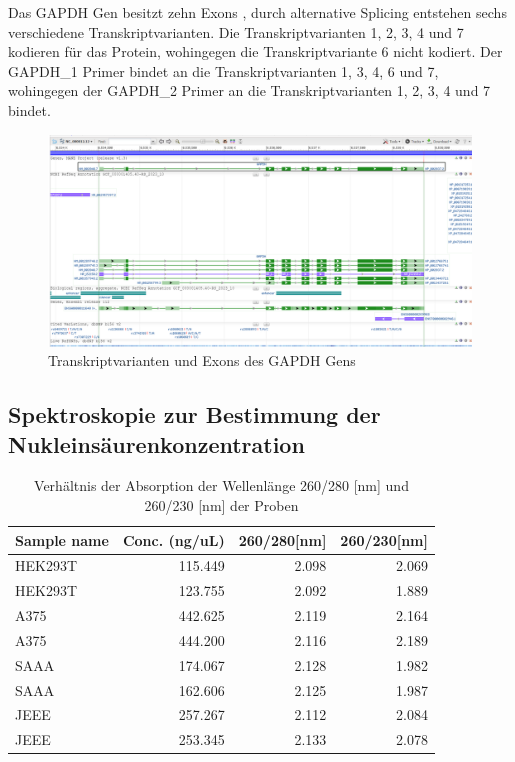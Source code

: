\documentclass{article}
\begin{document}
Das GAPDH Gen besitzt zehn Exons \cite{NCBIGene2597}, durch alternative Splicing entstehen sechs verschiedene Transkriptvarianten. Die Transkriptvarianten 1, 2, 3, 4 und 7 kodieren für das Protein, wohingegen die Transkriptvariante 6 nicht kodiert. Der GAPDH\_1 Primer bindet an die Transkriptvarianten 1, 3, 4, 6 und 7, wohingegen der GAPDH\_2 Primer an die Transkriptvarianten 1, 2, 3, 4 und 7 bindet.
\begin{figure}[H]
    \centering
    \includegraphics[width=\textwidth]{images/gapdh.png}
    \caption{Transkriptvarianten und Exons des GAPDH Gens \cite{NCBIGene2597_products}}
    \label{fig:exons}
\end{figure}

\subsection*{Spektroskopie zur Bestimmung der Nukleinsäurenkonzentration}

\begin{table}[H]
    \centering
    \begin{tabular}{lrrr}
    \toprule
    Sample name & Conc. (ng/uL) & 260/280[nm] & 260/230[nm] \\
    \midrule
    HEK293T & 115.449 & 2.098 & 2.069 \\
    HEK293T & 123.755 & 2.092 & 1.889 \\
    A375 & 442.625 & 2.119 & 2.164 \\
    A375 & 444.200 & 2.116 & 2.189 \\
    SAAA & 174.067 & 2.128 & 1.982 \\
    SAAA & 162.606 & 2.125 & 1.987 \\
    JEEE & 257.267 & 2.112 & 2.084 \\
    JEEE & 253.345 & 2.133 & 2.078 \\
    \bottomrule
    \end{tabular}
    \caption{Verhältnis der Absorption der Wellenlänge 260/280 [nm] und 260/230 [nm] der Proben}
\end{table}
\end{document}
